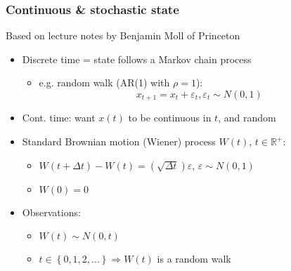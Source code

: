 \documentclass[bigger,handout]{beamer}
\begin{document}
\begin{frame}%
\frametitle{Continuous \& stochastic state}

\begin{center}
{\small Based on lecture notes by Benjamin Moll of Princeton}
\end{center}

\begin{itemize}
\item Discrete time = state follows a Markov chain process

\begin{itemize}
\item e.g. random walk (AR(1) with $\rho =1$):
\begin{equation*}
x_{t+1}=x_{t}+\varepsilon _{t},\varepsilon _{t}\sim N\left( 0,1\right)
\end{equation*}
\end{itemize}

\item Cont. time: want $x\left( t\right) $ to be continuous in $t$, and
random

\item Standard Brownian motion (Wiener) process $W\left( t\right) $, $t\in
\mathbb{R}^{+}$:

\begin{itemize}
\item $W\left( t+\Delta t\right) -W\left( t\right) =\left( \sqrt{\Delta t}%
\right) \varepsilon $, $\varepsilon \sim N\left( 0,1\right) $

\item $W\left( 0\right) =0$
\end{itemize}

\item Observations:

\begin{itemize}
\item $W\left( t\right) \sim N\left( 0,t\right) $

\item $t\in \left\{ 0,1,2,...\right\} \Rightarrow W\left( t\right) $ is a
random walk
\end{itemize}
\end{itemize}

\end{frame}%
\end{document}

